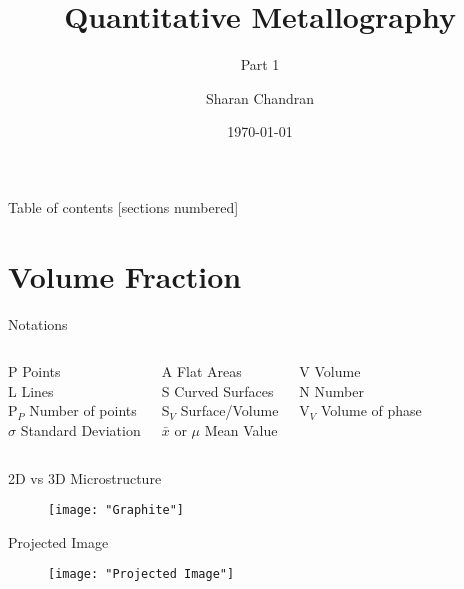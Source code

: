 \documentclass[10pt]{beamer}
\title{Quantitative Metallography}
\subtitle{Part 1}
\date{\today}
\author{Sharan Chandran}
\institute{Indian Institute of Science}
\begin{document}
\graphicspath{{../Images/}} 

\maketitle


\begin{frame}{Table of contents}
  [sections numbered]
  \tableofcontents[hideallsubsections]
\end{frame}

\section{Volume Fraction}

\begin{frame}{Notations}


  \begin{columns}[T,onlytextwidth]
    P Points \\
    L Lines  \\
    P$ _{P} $ Number of points \\
    $\sigma$ Standard Deviation
 
   A Flat Areas \\
   S Curved Surfaces \\
   S$ _{V} $ Surface/Volume \\
   $\bar{x}$ or $\mu$ Mean Value
  
    V Volume \\
    N Number \\
    V$ _{V} $ Volume of phase
\end{columns}     

\end{frame}
{%
\begin{frame}[fragile]{2D vs 3D Microstructure}

\begin{figure}[H]
\texttt{[image: "Graphite"]}

\end{figure}
    
\end{frame}
}
{%
\begin{frame}[fragile]{Projected Image}

\begin{figure}[H]
\texttt{[image: "Projected Image"]}

\end{figure}
    
\end{frame}
}
\end{document}
